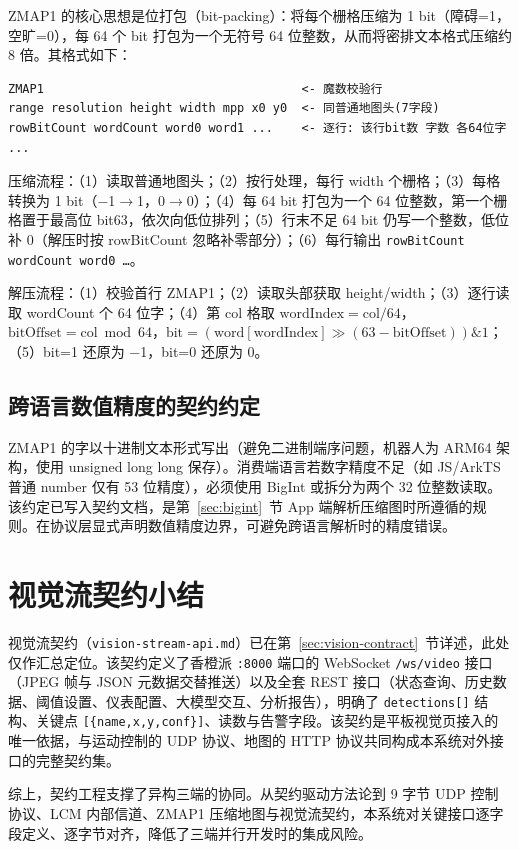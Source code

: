 ZMAP1 的核心思想是位打包（bit-packing）：将每个栅格压缩为 1 bit（障碍=1，空旷=0），每 64 个 bit 打包为一个无符号 64 位整数，从而将密排文本格式压缩约 8 倍。其格式如下：

\begin{lstlisting}
ZMAP1                                    <- 魔数校验行
range resolution height width mpp x0 y0  <- 同普通地图头(7字段)
rowBitCount wordCount word0 word1 ...    <- 逐行: 该行bit数 字数 各64位字
...
\end{lstlisting}

压缩流程：（1）读取普通地图头；（2）按行处理，每行 width 个栅格；（3）每格转换为 1 bit（$-$1$\to$1，0$\to$0）；（4）每 64 bit 打包为一个 64 位整数，第一个栅格置于最高位 bit63，依次向低位排列；（5）行末不足 64 bit 仍写一个整数，低位补 0（解压时按 rowBitCount 忽略补零部分）；（6）每行输出 \texttt{rowBitCount wordCount word0 \ldots}。

解压流程：（1）校验首行 ZMAP1；（2）读取头部获取 height/width；（3）逐行读取 wordCount 个 64 位字；（4）第 col 格取 $\text{wordIndex}=\text{col}/64$，$\text{bitOffset}=\text{col}\bmod 64$，$\text{bit}=(\text{word}[\text{wordIndex}]\gg(63-\text{bitOffset}))\mathbin{\&}1$；（5）bit=1 还原为 $-$1，bit=0 还原为 0。

\subsection{跨语言数值精度的契约约定}
\label{sec:cross-language-precision}

ZMAP1 的字以十进制文本形式写出（避免二进制端序问题，机器人为 ARM64 架构，使用 unsigned long long 保存）。消费端语言若数字精度不足（如 JS/ArkTS 普通 number 仅有 53 位精度），必须使用 BigInt 或拆分为两个 32 位整数读取。该约定已写入契约文档，是第~\ref{sec:bigint}~节 App 端解析压缩图时所遵循的规则。在协议层显式声明数值精度边界，可避免跨语言解析时的精度错误。

\section{视觉流契约小结}
\label{sec:vision-contract-summary}

视觉流契约（\texttt{vision-stream-api.md}）已在第~\ref{sec:vision-contract}~节详述，此处仅作汇总定位。该契约定义了香橙派 \texttt{:8000} 端口的 WebSocket \texttt{/ws/video} 接口（JPEG 帧与 JSON 元数据交替推送）以及全套 REST 接口（状态查询、历史数据、阈值设置、仪表配置、大模型交互、分析报告），明确了 \texttt{detections[]} 结构、关键点 \texttt{[\{name,x,y,conf\}]}、读数与告警字段。该契约是平板视觉页接入的唯一依据，与运动控制的 UDP 协议、地图的 HTTP 协议共同构成本系统对外接口的完整契约集。

综上，契约工程支撑了异构三端的协同。从契约驱动方法论到 9 字节 UDP 控制协议、LCM 内部信道、ZMAP1 压缩地图与视觉流契约，本系统对关键接口逐字段定义、逐字节对齐，降低了三端并行开发时的集成风险。
